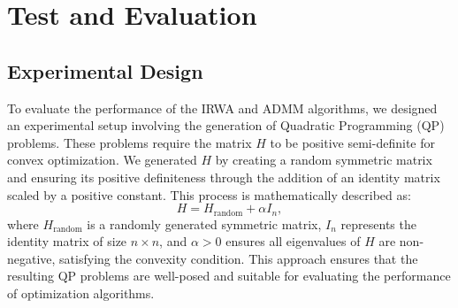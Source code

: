 \documentclass{article}
\begin{document}






\section{Test and Evaluation}
\subsection{Experimental Design}

To evaluate the performance of the IRWA and ADMM algorithms, we designed an experimental setup involving the generation of Quadratic Programming (QP) problems. These problems require the matrix \(H\) to be positive semi-definite for convex optimization. We generated \(H\) by creating a random symmetric matrix and ensuring its positive definiteness through the addition of an identity matrix scaled by a positive constant. This process is mathematically described as:
\[
H = H_{\text{random}} + \alpha I_n,
\]
where \(H_{\text{random}}\) is a randomly generated symmetric matrix, \(I_n\) represents the identity matrix of size \(n \times n\), and \(\alpha > 0\) ensures all eigenvalues of \(H\) are non-negative, satisfying the convexity condition. This approach ensures that the resulting QP problems are well-posed and suitable for evaluating the performance of optimization algorithms.
\end{document}
